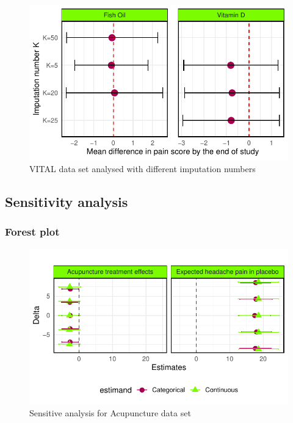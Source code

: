\documentclass{article}
\newcommand{\pandocbounded}[1]{#1}
\begin{document}
\begin{figure}
\centering
\pandocbounded{\includegraphics[keepaspectratio]{Final_Report_files/figure-latex/unnamed-chunk-32-1.pdf}}
\caption{VITAL data set analysed with different imputation numbers}
\end{figure}

\subsection{Sensitivity analysis}\label{sensitivity-analysis-1}

\subsubsection{Forest plot}\label{forest-plot}

\begin{figure}
\centering
\pandocbounded{\includegraphics[keepaspectratio]{Final_Report_files/figure-latex/unnamed-chunk-33-1.pdf}}
\caption{Sensitive analysis for Acupuncture data set}
\end{figure}
\end{document}
